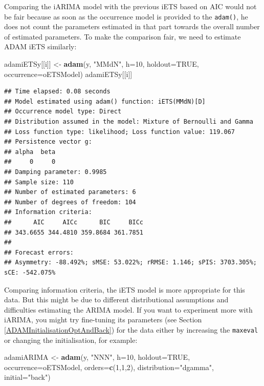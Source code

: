 \documentclass[]{book}
\newenvironment{Shaded}{\begin{snugshade}}{\end{snugshade}}
\newcommand{\DataTypeTok}[1]{\textcolor[rgb]{0.13,0.29,0.53}{#1}}
\newcommand{\DecValTok}[1]{\textcolor[rgb]{0.00,0.00,0.81}{#1}}
\newcommand{\KeywordTok}[1]{\textcolor[rgb]{0.13,0.29,0.53}{\textbf{#1}}}
\newcommand{\NormalTok}[1]{#1}
\newcommand{\OtherTok}[1]{\textcolor[rgb]{0.56,0.35,0.01}{#1}}
\newcommand{\StringTok}[1]{\textcolor[rgb]{0.31,0.60,0.02}{#1}}
\theoremstyle{definition}
\theoremstyle{definition}
\theoremstyle{definition}
\theoremstyle{definition}
\theoremstyle{remark}
\begin{document}
Comparing the iARIMA model with the previous iETS based on AIC would not be fair because as soon as the occurrence model is provided to the \texttt{adam()}, he does not count the parameters estimated in that part towards the overall number of estimated parameters. To make the comparison fair, we need to estimate ADAM iETS similarly:

\begin{Shaded}
\begin{Highlighting}[]
\NormalTok{adamiETSy[[i]] <-}\StringTok{ }\KeywordTok{adam}\NormalTok{(y, }\StringTok{"MMdN"}\NormalTok{, }\DataTypeTok{h=}\DecValTok{10}\NormalTok{, }\DataTypeTok{holdout=}\OtherTok{TRUE}\NormalTok{,}
                       \DataTypeTok{occurrence=}\NormalTok{oETSModel)}
\NormalTok{adamiETSy[[i]]}
\end{Highlighting}
\end{Shaded}

\begin{verbatim}
## Time elapsed: 0.08 seconds
## Model estimated using adam() function: iETS(MMdN)[D]
## Occurrence model type: Direct
## Distribution assumed in the model: Mixture of Bernoulli and Gamma
## Loss function type: likelihood; Loss function value: 119.067
## Persistence vector g:
## alpha  beta 
##     0     0 
## Damping parameter: 0.9985
## Sample size: 110
## Number of estimated parameters: 6
## Number of degrees of freedom: 104
## Information criteria:
##      AIC     AICc      BIC     BICc 
## 343.6655 344.4810 359.8684 361.7851 
## 
## Forecast errors:
## Asymmetry: -88.492%; sMSE: 53.022%; rRMSE: 1.146; sPIS: 3703.305%; sCE: -542.075%
\end{verbatim}

Comparing information criteria, the iETS model is more appropriate for this data. But this might be due to different distributional assumptions and difficulties estimating the ARIMA model. If you want to experiment more with iARIMA, you might try fine-tuning its parameters (see Section \ref{ADAMInitialisationOptAndBack}) for the data either by increasing the \texttt{maxeval} or changing the initialisation, for example:

\begin{Shaded}
\begin{Highlighting}[]
\NormalTok{adamiARIMA <-}\StringTok{ }\KeywordTok{adam}\NormalTok{(y, }\StringTok{"NNN"}\NormalTok{, }\DataTypeTok{h=}\DecValTok{10}\NormalTok{, }\DataTypeTok{holdout=}\OtherTok{TRUE}\NormalTok{,}
                   \DataTypeTok{occurrence=}\NormalTok{oETSModel, }\DataTypeTok{orders=}\KeywordTok{c}\NormalTok{(}\DecValTok{1}\NormalTok{,}\DecValTok{1}\NormalTok{,}\DecValTok{2}\NormalTok{),}
                   \DataTypeTok{distribution=}\StringTok{"dgamma"}\NormalTok{, }\DataTypeTok{initial=}\StringTok{"back"}\NormalTok{)}
\end{Highlighting}
\end{Shaded}
\end{document}
